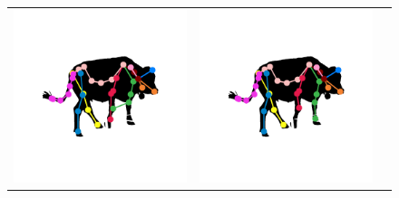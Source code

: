 \begin{figure}[t]
\begin{floatrow}
{\begin{tabular}{ccc}
      \includegraphics[trim={6cm 6cm 6cm 6cm},clip,height=\comparisonheight]{ga_vs_qp/0069_skel_sil_raw.png}
     &
      \includegraphics[trim={6cm 6cm 6cm 6cm},clip,height=\comparisonheight]{ga_vs_qp/0069_skel_sil_cleaned_qp.png}

\end{tabular}}
\end{floatrow}
\end{figure}
